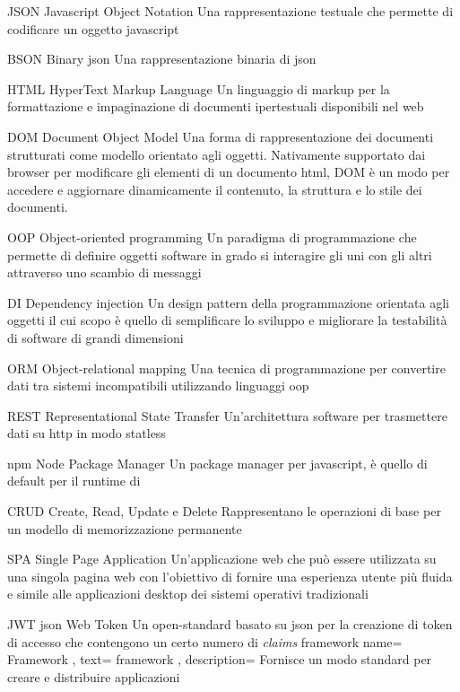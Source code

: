 {JSON}
{Javascript Object Notation}
{Una rappresentazione testuale che permette di codificare un oggetto \gls{javascript}}


{BSON}
{Binary \acrshort{json}}
{Una rappresentazione binaria di \gls{json}}


{HTML}
{HyperText Markup Language}
{Un linguaggio di markup per la formattazione e impaginazione di documenti ipertestuali disponibili nel web}

{DOM}
{Document Object Model}
{Una forma di rappresentazione dei documenti strutturati come modello orientato agli oggetti. Nativamente supportato dai browser per modificare gli elementi di un documento \acrshort{html}, DOM è un modo per accedere e aggiornare dinamicamente il contenuto, la struttura e lo stile dei documenti.}


{OOP}
{Object-oriented programming}
{Un paradigma di programmazione che permette di definire oggetti software in grado si interagire gli uni con gli altri attraverso uno scambio di messaggi}


{DI}
{Dependency injection}
{Un design pattern della programmazione orientata agli oggetti il cui scopo è quello di semplificare lo sviluppo e migliorare la testabilità di software di grandi dimensioni}

{ORM}
{Object-relational mapping}
{Una tecnica di programmazione per convertire dati tra sistemi incompatibili utilizzando linguaggi \gls{oop}}


{REST}
{Representational State Transfer}
{Un'architettura software per trasmettere dati su \acrshort{http} in modo statless}


{npm}
{Node Package Manager}
{Un package manager per \gls{javascript}, è quello di default per il runtime di \nodejs}



{CRUD}
{Create, Read, Update e Delete}
{Rappresentano le operazioni di base per un modello di memorizzazione permanente}


{SPA}
{Single Page Application}
{Un'applicazione web che può essere utilizzata su una singola pagina web con l'obiettivo di fornire una esperienza utente più fluida e simile alle applicazioni desktop dei sistemi operativi tradizionali}

{JWT}
{\acrshort{json} Web Token}
{Un open-standard basato su \acrshort{json} per la creazione di token di accesso che contengono un certo numero di \textit{claims}}
\newglossaryentry
{framework}
{
	name={
		Framework
	},
	text={
		framework
	},
	description={
		Fornisce un modo standard per creare e distribuire applicazioni
	}
}

